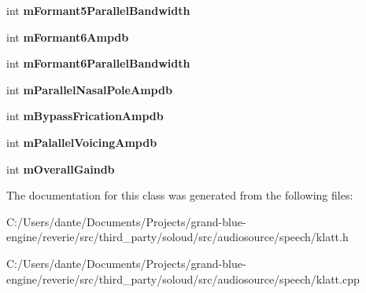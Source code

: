 \begin{DoxyCompactItemize}
int {\bfseries m\+Formant5\+Parallel\+Bandwidth}
\item 
\mbox{\label{classklatt__frame_aa9eebcb872df7fed230399f4523f10a8}} 
int {\bfseries m\+Formant6\+Ampdb}
\item 
\mbox{\label{classklatt__frame_ac04ef728158513e70cf4152c1ebe9267}} 
int {\bfseries m\+Formant6\+Parallel\+Bandwidth}
\item 
\mbox{\label{classklatt__frame_af99c9d37884f19c700060c6b906fc495}} 
int {\bfseries m\+Parallel\+Nasal\+Pole\+Ampdb}
\item 
\mbox{\label{classklatt__frame_a762a2fc594a9add350765019c5a494c2}} 
int {\bfseries m\+Bypass\+Frication\+Ampdb}
\item 
\mbox{\label{classklatt__frame_aa8628b285480b88324fe41648a7c6f57}} 
int {\bfseries m\+Palallel\+Voicing\+Ampdb}
\item 
\mbox{\label{classklatt__frame_a84a7acee66a4e2160e0c4465fcbb1719}} 
int {\bfseries m\+Overall\+Gaindb}
\end{DoxyCompactItemize}


The documentation for this class was generated from the following files\+:\begin{DoxyCompactItemize}
\item 
C\+:/\+Users/dante/\+Documents/\+Projects/grand-\/blue-\/engine/reverie/src/third\+\_\+party/soloud/src/audiosource/speech/klatt.\+h\item 
C\+:/\+Users/dante/\+Documents/\+Projects/grand-\/blue-\/engine/reverie/src/third\+\_\+party/soloud/src/audiosource/speech/klatt.\+cpp\end{DoxyCompactItemize}
